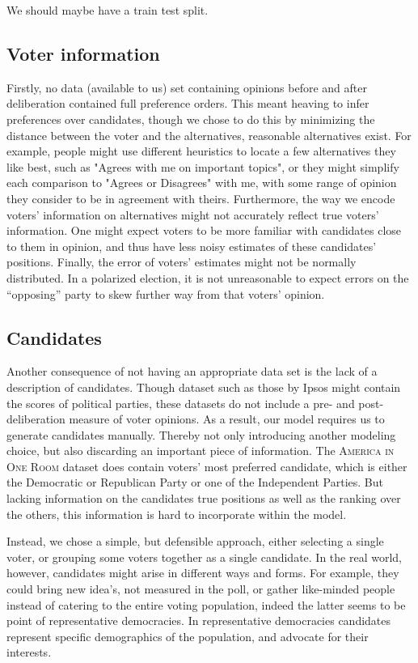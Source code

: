 We should maybe have a train test split.

\subsection{Voter information}

Firstly, no data (available to us) set containing opinions before and after
deliberation contained full preference orders. This meant heaving to infer
preferences over candidates, though we chose to do this by minimizing the
distance between the voter and the alternatives, reasonable alternatives exist.
For example, people might use different heuristics to locate a few alternatives
they like best, such as "Agrees with me on important topics", or they might
simplify each comparison to "Agrees or Disagrees" with me, with some range of
opinion they consider to be in agreement with theirs. Furthermore, the way we
encode voters' information on alternatives might not accurately reflect true
voters' information. One might expect voters to be more familiar with
candidates close to them in opinion, and thus have less noisy estimates of
these candidates' positions. Finally,  the error of voters' estimates might not
be normally distributed. In a polarized election, it is not unreasonable to
expect errors on the ``opposing'' party to skew further way from that voters'
opinion.


\subsection{Candidates}

Another consequence of not having an appropriate data
set is the lack of a description of candidates. Though dataset such as those by
Ipsos might contain the scores of political parties, these datasets do not
include a pre- and post-deliberation measure of voter opinions. As a result,
our model requires us to generate candidates manually. Thereby not only
introducing another modeling choice, but also discarding an important piece of
information. The \textsc{America in One Room} dataset does contain voters' most
preferred candidate, which is either the Democratic or Republican Party or one
of the Independent Parties. But lacking information on the candidates true
positions as well as the ranking over the others, this information is hard to
incorporate within the model.

Instead, we chose a simple, but defensible approach, either selecting a single
voter, or grouping some voters together as a single candidate. In the real
world, however, candidates might arise in different ways and forms. For
example, they could bring new idea's, not measured in the poll, or gather
like-minded people instead of catering to the entire voting population, indeed
the latter seems to be point of representative democracies. In representative
democracies candidates represent specific demographics of the population, and
advocate for their interests.



